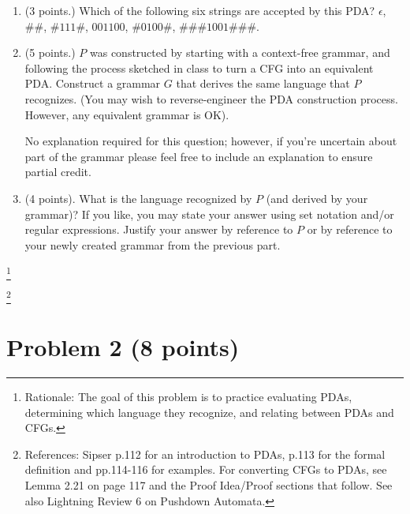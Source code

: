 \documentclass[letterpaper,11pt,twoside]{article}
\theoremstyle{plain}
\theoremstyle{definition}
\theoremstyle{remark}
\theoremstyle{restate}
\newcommand\blfootnote[1]{%
  \begingroup
  \renewcommand\thefootnote{}\footnote{#1}%
  \addtocounter{footnote}{-1}%
  \endgroup
}
\begin{document}
    \begin{enumerate}
        \item (3 points.) Which of the following six strings are accepted by this PDA? $\epsilon$, $\#\#$, $\#111\#$, $001100$, $\#0100\#$, $\#\#\#1001\#\#\#$. 
        
        \item (5 points.) $P$ was constructed by starting with a context-free grammar, and following the process sketched in class to turn a CFG into an equivalent PDA. Construct a grammar $G$ that derives the same language that $P$ recognizes. (You may wish to reverse-engineer the PDA construction process. However, any equivalent grammar is OK).

        No explanation required for this question; however, if you're uncertain about part of the grammar please feel free to include an explanation to ensure partial credit.

         \item (4 points). What is the language recognized by $P$ (and derived by your grammar)? If you like, you may state your answer using set notation and/or regular expressions. Justify your answer by reference to $P$ or by reference to your newly created grammar from the previous part.

    \end{enumerate}

    \blfootnote{ Rationale: The goal of this problem is to practice evaluating PDAs, determining which language they recognize, and relating between PDAs and CFGs. }
    \blfootnote{ References: Sipser p.112 for an introduction to PDAs, p.113 for the formal definition and pp.114-116 for examples. For converting CFGs to PDAs, see Lemma 2.21 on page 117 and the Proof Idea/Proof sections that follow. See also Lightning Review 6 on Pushdown Automata. }



\clearpage
\section*{Problem 2 (8 points)}
\end{document}

